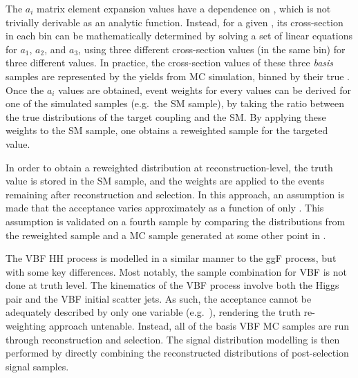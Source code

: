 


    The $a_i$ matrix element expansion values have a dependence on \mhh, which is not trivially derivable as an analytic function.
    Instead, for a given \kl, its cross-section in each \mhh bin can be mathematically determined by solving a set of linear equations for $a_1$, $a_2$, and $a_3$,
        using three different cross-section values (in the same \mhh bin) for three different \kl values.
    In practice, the cross-section values of these three \textit{basis} samples are represented by the yields from MC simulation, binned by their true \mhh.
    Once the $a_i$ values are obtained, event weights for every \kl values can be derived for one of the simulated samples (e.g.\ the SM sample),
        by taking the ratio between the true \mhh distributions of the target coupling and the SM.
    By applying these weights to the SM sample, one obtains a reweighted sample for the targeted \kl value.

    In order to obtain a reweighted distribution at reconstruction-level, the truth \mhh value is stored in the SM sample, and the weights are applied to the events remaining after reconstruction and selection.
    In this approach, an assumption is made that the acceptance varies approximately as a function of only \mhh.
    This assumption is validated on a fourth sample by comparing the distributions from the reweighted sample and a MC sample generated at some other point in \kl.

    The VBF HH process is modelled in a similar manner to the ggF process, but with some key differences.
    Most notably, the sample combination for VBF is not done at truth level.
    The kinematics of the VBF process involve both the Higgs pair and the VBF initial scatter jets.
    As such, the acceptance cannot be adequately described by only one variable (e.g.\ \mhh), rendering the truth re-weighting approach untenable.
    Instead, all of the basis VBF MC samples are run through reconstruction and selection.
    The signal distribution modelling is then performed by directly combining the reconstructed \mhh distributions of post-selection signal samples.

